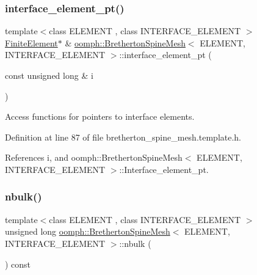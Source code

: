 \mbox{\label{classoomph_1_1BrethertonSpineMesh_a3d14f3985d718867099747e5b3750fec}} 
\subsubsection{\texorpdfstring{interface\+\_\+element\+\_\+pt()}{interface\_element\_pt()}}
{\footnotesize\ttfamily template$<$class E\+L\+E\+M\+E\+NT , class I\+N\+T\+E\+R\+F\+A\+C\+E\+\_\+\+E\+L\+E\+M\+E\+NT $>$ \\
\hyperlink{classoomph_1_1FiniteElement}{Finite\+Element}$\ast$ \& \hyperlink{classoomph_1_1BrethertonSpineMesh}{oomph\+::\+Bretherton\+Spine\+Mesh}$<$ E\+L\+E\+M\+E\+NT, I\+N\+T\+E\+R\+F\+A\+C\+E\+\_\+\+E\+L\+E\+M\+E\+NT $>$\+::interface\+\_\+element\+\_\+pt (\begin{DoxyParamCaption}\item[{const unsigned long \&}]{i }\end{DoxyParamCaption})\hspace{0.3cm}{\ttfamily [inline]}}



Access functions for pointers to interface elements. 



Definition at line 87 of file bretherton\+\_\+spine\+\_\+mesh.\+template.\+h.



References i, and oomph\+::\+Bretherton\+Spine\+Mesh$<$ E\+L\+E\+M\+E\+N\+T, I\+N\+T\+E\+R\+F\+A\+C\+E\+\_\+\+E\+L\+E\+M\+E\+N\+T $>$\+::\+Interface\+\_\+element\+\_\+pt.

\mbox{\label{classoomph_1_1BrethertonSpineMesh_a47184866746a1fce6dd0ca27ab7e17ce}} 
\subsubsection{\texorpdfstring{nbulk()}{nbulk()}}
{\footnotesize\ttfamily template$<$class E\+L\+E\+M\+E\+NT , class I\+N\+T\+E\+R\+F\+A\+C\+E\+\_\+\+E\+L\+E\+M\+E\+NT $>$ \\
unsigned long \hyperlink{classoomph_1_1BrethertonSpineMesh}{oomph\+::\+Bretherton\+Spine\+Mesh}$<$ E\+L\+E\+M\+E\+NT, I\+N\+T\+E\+R\+F\+A\+C\+E\+\_\+\+E\+L\+E\+M\+E\+NT $>$\+::nbulk (\begin{DoxyParamCaption}{ }\end{DoxyParamCaption}) const\hspace{0.3cm}{\ttfamily [inline]}}



